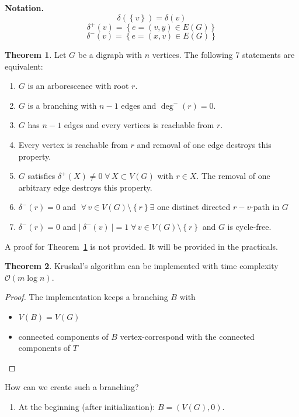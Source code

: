 \documentclass[a4paper]{article}
\theoremstyle{definition}
\newtheorem{theorem}{Theorem}
\newcommand{\card}[1]{\left|\:\!#1\:\!\right|}
\newcommand{\set}[1]{\left\{#1\right\}}
\newcommand{\fall}{\;\forall\,}
\newcommand{\noproof}[1]{A proof for Theorem~\ref{#1} is not provided.}
\begin{document}
\textbf{Notation.}
  \[
    \delta(\set{v}) = \delta(v)
  \] \[
    \delta^+(v) = \set{e = (v, y) \in E(G)}
  \] \[
    \delta^-(v) = \set{e = (x, v) \in E(G)}
  \]

\begin{theorem}\label{satz-2.4}
  Let $G$ be a digraph with $n$ vertices. The following 7 statements are equivalent:
\begin{enumerate}
  \item $G$ is an arborescence with root $r$.
  \item $G$ is a branching with $n-1$ edges and $\operatorname{deg}^-(r) = 0$.
  \item $G$ has $n-1$ edges and every vertices is reachable from $r$.
  \item Every vertex is reachable from $r$ and removal of one edge destroys this property.
  \item $G$ satisfies $\delta^+(X) \neq 0 \fall X \subset V(G)$ with $r \in X$. The removal of one arbitrary edge destroys this property.
  \item $\delta^-(r) = 0$ and $\fall v \in V(G) \setminus \set{r} \exists$ one distinct directed $r-v$-path in $G$
  \item $\delta^-(r) = 0$ and $\card{\delta^-(v)} = 1 \fall v \in V(G) \setminus \set{r}$ and $G$ is cycle-free.
\end{enumerate}
\end{theorem}

\noproof{satz-2.4} It will be provided in the practicals.

\begin{theorem}\label{satz-2.5}
  Kruskal's algorithm can be implemented with time complexity $\mathcal{O}(m \log{n})$.
\end{theorem}

\begin{proof}
  The implementation keeps a branching $B$ with
  \begin{itemize}
    \item $V(B) = V(G)$
    \item connected components of $B$ vertex-correspond with the connected components of $T$
  \end{itemize}
\end{proof}

How can we create such a branching?
\begin{enumerate}
  \item At the beginning (after initialization): $B = (V(G), 0)$.
\end{enumerate}
\end{document}
